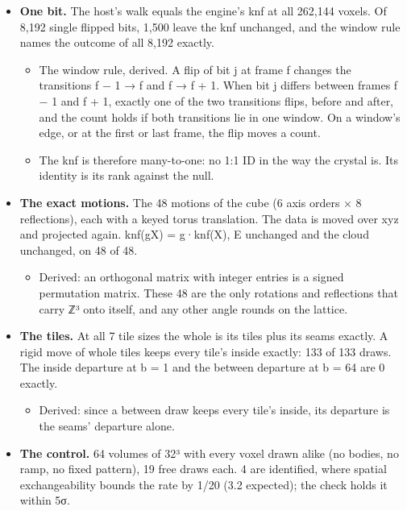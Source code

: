 \begin{itemize}
\item \textbf{One bit.} The host's walk equals the engine's knf at all 262,144 voxels. Of 8,192 single flipped bits, 1,500 leave the knf unchanged, and the window rule names the outcome of all 8,192 exactly.

\begin{itemize}
\item The window rule, derived. A flip of bit j at frame f changes the transitions f − 1 → f and f → f + 1. When bit j differs between frames f − 1 and f + 1, exactly one of the two transitions flips, before and after, and the count holds if both transitions lie in one window. On a window's edge, or at the first or last frame, the flip moves a count.
\item The knf is therefore many-to-one: no 1:1 ID in the way the crystal is. Its identity is its rank against the null.
\end{itemize}
\item \textbf{The exact motions.} The 48 motions of the cube (6 axis orders × 8 reflections), each with a keyed torus translation. The data is moved over xyz and projected again. knf(gX) = g·knf(X), E unchanged and the cloud unchanged, on 48 of 48.

\begin{itemize}
\item Derived: an orthogonal matrix with integer entries is a signed permutation matrix. These 48 are the only rotations and reflections that carry ℤ³ onto itself, and any other angle rounds on the lattice.
\end{itemize}
\item \textbf{The tiles.} At all 7 tile sizes the whole is its tiles plus its seams exactly. A rigid move of whole tiles keeps every tile's inside exactly: 133 of 133 draws. The inside departure at b = 1 and the between departure at b = 64 are 0 exactly.

\begin{itemize}
\item Derived: since a between draw keeps every tile's inside, its departure is the seams' departure alone.
\end{itemize}
\item \textbf{The control.} 64 volumes of 32³ with every voxel drawn alike (no bodies, no ramp, no fixed pattern), 19 free draws each. 4 are identified, where spatial exchangeability bounds the rate by 1/20 (3.2 expected); the check holds it within 5σ.
\end{itemize}

